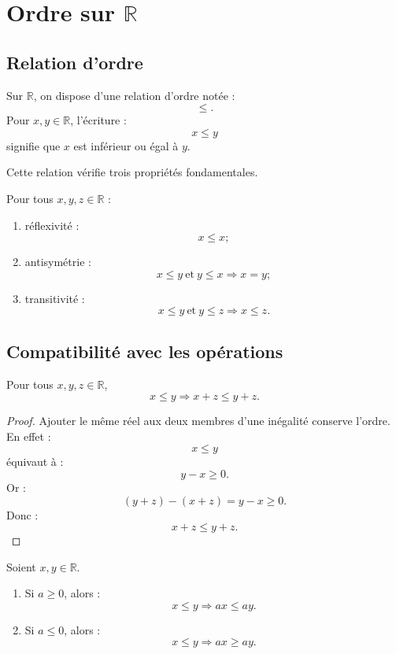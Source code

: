 \documentclass[11pt,a4paper]{article}
\newcommand{\R}{\mathbb R}
\newcommand{\implique}{\Longrightarrow}
\begin{document}
\section{Ordre sur \(\R\)}

\subsection{Relation d'ordre}

\begin{definitionbox}[Ordre naturel sur \(\R\)]
Sur \(\R\), on dispose d'une relation d'ordre notée :
\[
\leq.
\]
Pour \(x,y\in\R\), l'écriture :
\[
x\leq y
\]
signifie que \(x\) est inférieur ou égal à \(y\).
\end{definitionbox}

Cette relation vérifie trois propriétés fondamentales.

\begin{theorembox}
Pour tous \(x,y,z\in\R\) :
\begin{enumerate}
    \item réflexivité :
    \[
    x\leq x ;
    \]
    \item antisymétrie :
    \[
    x\leq y\ \text{et}\ y\leq x \implique x=y ;
    \]
    \item transitivité :
    \[
    x\leq y\ \text{et}\ y\leq z \implique x\leq z.
    \]
\end{enumerate}
\end{theorembox}

\subsection{Compatibilité avec les opérations}

\begin{theorembox}[Addition]
Pour tous \(x,y,z\in\R\),
\[
x\leq y \implique x+z\leq y+z.
\]
\end{theorembox}

\begin{proof}
Ajouter le même réel aux deux membres d'une inégalité conserve l'ordre.  
En effet :
\[
x\leq y
\]
équivaut à :
\[
y-x\geq0.
\]
Or :
\[
(y+z)-(x+z)=y-x\geq0.
\]
Donc :
\[
x+z\leq y+z.
\]
\end{proof}

\begin{theorembox}
Soient \(x,y\in\R\).
\begin{enumerate}
    \item Si \(a\geq0\), alors :
    \[
    x\leq y \implique ax\leq ay.
    \]
    \item Si \(a\leq0\), alors :
    \[
    x\leq y \implique ax\geq ay.
    \]
\end{enumerate}
\end{theorembox}
\end{document}
